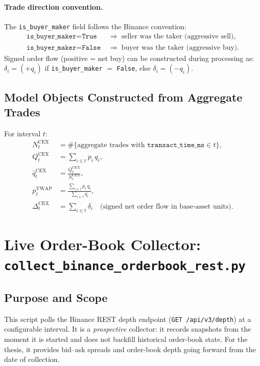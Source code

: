 \documentclass[11pt,a4paper]{article}
\begin{document}
\paragraph{Trade direction convention.}
The \texttt{is\_buyer\_maker} field follows the Binance convention:
\begin{align*}
  \texttt{is\_buyer\_maker} = \texttt{True}
  &\;\Rightarrow\; \text{seller was the taker (aggressive sell)},\\
  \texttt{is\_buyer\_maker} = \texttt{False}
  &\;\Rightarrow\; \text{buyer was the taker (aggressive buy)}.
\end{align*}
Signed order flow (positive = net buy) can be constructed during
processing as:
$\delta_i = (+q_i)$ if \texttt{is\_buyer\_maker} $=$ \texttt{False},
else $\delta_i = (-q_i)$.

\subsection{Model Objects Constructed from Aggregate Trades}

For interval $t$:
\begin{align*}
  N_t^{\mathrm{CEX}} &=
    \#\{\text{aggregate trades with }
    \texttt{transact\_time\_ms} \in t\}, \\
  Q_t^{\mathrm{CEX}} &= \sum_{i \in t} p_i\, q_i, \\
  \bar{q}_t^{\mathrm{CEX}} &=
    \frac{Q_t^{\mathrm{CEX}}}{N_t^{\mathrm{CEX}}}, \\
  p_t^{\mathrm{VWAP}} &=
    \frac{\sum_{i \in t} p_i\, q_i}{\sum_{i \in t} q_i}, \\
  \Delta_t^{\mathrm{CEX}} &=
    \sum_{i \in t} \delta_i
    \quad \text{(signed net order flow in base-asset units)}.
\end{align*}

\section{Live Order-Book Collector:
  \texttt{collect\_binance\_orderbook\_rest.py}}
\label{sec:orderbook}

\subsection{Purpose and Scope}

This script polls the Binance REST depth endpoint
(\texttt{GET /api/v3/depth}) at a configurable interval. It is a
\emph{prospective} collector: it records snapshots from the moment
it is started and does not backfill historical order-book state.
For the thesis, it provides bid--ask spreads and order-book depth
going forward from the date of collection.
\end{document}
